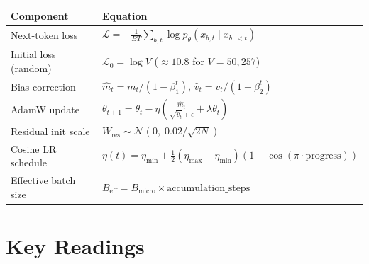 \begin{center}
\renewcommand{\arraystretch}{1.6}
\begin{tabularx}{\textwidth}{@{}lX@{}}
\toprule
Component & Equation \\
\midrule
Next-token loss & $\mathcal{L} = -\frac{1}{BT}\sum_{b,t} \log p_\theta(x_{b,t} \mid x_{b,<t})$ \\[4pt]
Initial loss (random) & $\mathcal{L}_0 = \log V$ \quad ($\approx 10.8$ for $V = 50{,}257$) \\[4pt]
Bias correction & $\hat{m}_t = m_t/(1-\beta_1^t)$, \quad $\hat{v}_t = v_t/(1-\beta_2^t)$ \\[4pt]
AdamW update & $\theta_{t+1} = \theta_t - \eta \left(\frac{\hat{m}_t}{\sqrt{\hat{v}_t} + \epsilon} + \lambda \theta_t\right)$ \\[4pt]
Residual init scale & $W_{\text{res}} \sim \mathcal{N}(0,\; 0.02/\sqrt{2N})$ \\[4pt]
Cosine LR schedule & $\eta(t) = \eta_{\min} + \tfrac{1}{2}(\eta_{\max} - \eta_{\min})(1 + \cos(\pi \cdot \text{progress}))$ \\[4pt]
Effective batch size & $B_{\text{eff}} = B_{\text{micro}} \times \text{accumulation\_steps}$ \\
\bottomrule
\end{tabularx}
\end{center}


\section*{Key Readings}

